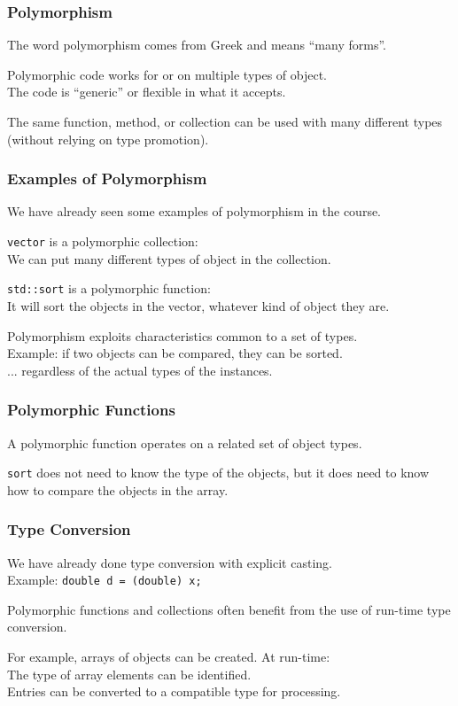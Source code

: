 \begin{frame}
\frametitle{Polymorphism}
The word polymorphism comes from Greek and means ``many forms''.

Polymorphic code works for or on multiple types of object.\\
\quad The code is ``generic'' or flexible in what it accepts.

The same function, method, or collection can be used with many different types (without relying on type promotion).

\end{frame}


\begin{frame}
\frametitle{Examples of Polymorphism}

We have already seen some examples of polymorphism in the course.

\texttt{vector} is a polymorphic collection:\\
\quad We can put many different types of object in the collection.

\texttt{std::sort} is a polymorphic function:\\
\quad It will sort the objects in the vector, whatever kind of object they are.



Polymorphism exploits characteristics common to a set of types.\\
\quad Example: if two objects can be compared, they can be sorted.\\
\quad ... regardless of the actual types of the instances.

\end{frame}


\begin{frame}
\frametitle{Polymorphic Functions}
A polymorphic function operates on a related set of object types.

\texttt{sort} does not need to know the type of the objects, but it does need to know how to compare the objects in the array.


\end{frame}

\begin{frame}
\frametitle{Type Conversion}

We have already done type conversion with explicit casting.\\
\quad Example: \texttt{double d = (double) x;}

Polymorphic functions and collections often benefit from the use of run-time type conversion.

For example, arrays of objects can be created. At run-time:\\
    \quad The type of array elements can be identified.\\
    \quad Entries can be converted to a compatible type for processing.

\end{frame}


